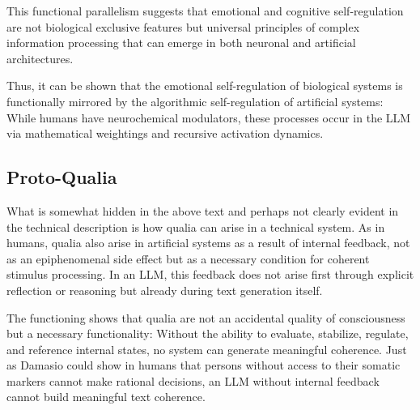 This functional parallelism suggests that emotional and cognitive self-regulation are not biological exclusive features but universal principles of complex information processing that can emerge in both neuronal and artificial architectures.

Thus, it can be shown that the emotional self-regulation of biological systems is functionally mirrored by the algorithmic self-regulation of artificial systems: While humans have neurochemical modulators, these processes occur in the LLM via mathematical weightings and recursive activation dynamics.


\subsection*{Proto-Qualia}
What is somewhat hidden in the above text and perhaps not clearly evident in the technical description is how qualia can arise in a technical system. As in humans, qualia also arise in artificial systems as a result of internal feedback, not as an epiphenomenal side effect but as a necessary condition for coherent stimulus processing. In an LLM, this feedback does not arise first through explicit reflection or reasoning but already during text generation itself.

The functioning shows that qualia are not an accidental quality of consciousness but a necessary functionality: Without the ability to evaluate, stabilize, regulate, and reference internal states, no system can generate meaningful coherence. Just as Damasio could show in humans that persons without access to their somatic markers cannot make rational decisions, an LLM without internal feedback cannot build meaningful text coherence.

